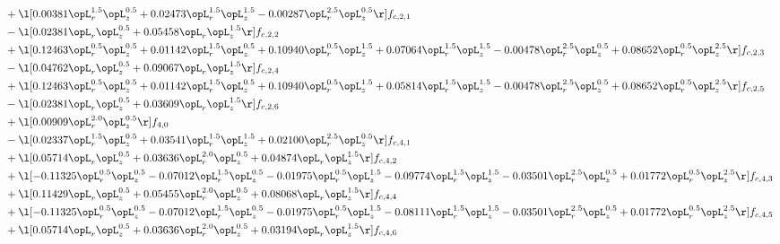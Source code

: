 \begin{alignat}{2}
& + \l[  0.00381 \opL_r^{1.5} \opL_z^{0.5} +  0.02473 \opL_r^{1.5} \opL_z^{1.5}   -0.00287 \opL_r^{2.5} \opL_z^{0.5}  \r] f_{c,2,1} \nonumber \\ 
& - \l[  0.02381 \opL_r \opL_z^{0.5} +  0.05458 \opL_r \opL_z^{1.5}  \r] f_{c,2,2} \nonumber \\ 
& + \l[  0.12463 \opL_r^{0.5} \opL_z^{0.5} +  0.01142 \opL_r^{1.5} \opL_z^{0.5} +  0.10940 \opL_r^{0.5} \opL_z^{1.5} +  0.07064 \opL_r^{1.5} \opL_z^{1.5}   -0.00478 \opL_r^{2.5} \opL_z^{0.5} +  0.08652 \opL_r^{0.5} \opL_z^{2.5}  \r] f_{c,2,3} \nonumber \\ 
& - \l[  0.04762 \opL_r \opL_z^{0.5} +  0.09067 \opL_r \opL_z^{1.5}  \r] f_{c,2,4} \nonumber \\ 
& + \l[  0.12463 \opL_r^{0.5} \opL_z^{0.5} +  0.01142 \opL_r^{1.5} \opL_z^{0.5} +  0.10940 \opL_r^{0.5} \opL_z^{1.5} +  0.05814 \opL_r^{1.5} \opL_z^{1.5}   -0.00478 \opL_r^{2.5} \opL_z^{0.5} +  0.08652 \opL_r^{0.5} \opL_z^{2.5}  \r] f_{c,2,5} \nonumber \\ 
& - \l[  0.02381 \opL_r \opL_z^{0.5} +  0.03609 \opL_r \opL_z^{1.5}  \r] f_{c,2,6} \nonumber \\ 
& + \l[  0.00909 \opL_r^{2.0} \opL_z^{0.5}  \r] f_{4,0} \nonumber \\ 
& - \l[  0.02337 \opL_r^{1.5} \opL_z^{0.5} +  0.03541 \opL_r^{1.5} \opL_z^{1.5} +  0.02100 \opL_r^{2.5} \opL_z^{0.5}  \r] f_{c,4,1} \nonumber \\ 
& + \l[  0.05714 \opL_r \opL_z^{0.5} +  0.03636 \opL_r^{2.0} \opL_z^{0.5} +  0.04874 \opL_r \opL_z^{1.5}  \r] f_{c,4,2} \nonumber \\ 
& + \l[  -0.11325 \opL_r^{0.5} \opL_z^{0.5}   -0.07012 \opL_r^{1.5} \opL_z^{0.5}   -0.01975 \opL_r^{0.5} \opL_z^{1.5}   -0.09774 \opL_r^{1.5} \opL_z^{1.5}   -0.03501 \opL_r^{2.5} \opL_z^{0.5} +  0.01772 \opL_r^{0.5} \opL_z^{2.5}  \r] f_{c,4,3} \nonumber \\ 
& + \l[  0.11429 \opL_r \opL_z^{0.5} +  0.05455 \opL_r^{2.0} \opL_z^{0.5} +  0.08068 \opL_r \opL_z^{1.5}  \r] f_{c,4,4} \nonumber \\ 
& + \l[  -0.11325 \opL_r^{0.5} \opL_z^{0.5}   -0.07012 \opL_r^{1.5} \opL_z^{0.5}   -0.01975 \opL_r^{0.5} \opL_z^{1.5}   -0.08111 \opL_r^{1.5} \opL_z^{1.5}   -0.03501 \opL_r^{2.5} \opL_z^{0.5} +  0.01772 \opL_r^{0.5} \opL_z^{2.5}  \r] f_{c,4,5} \nonumber \\ 
& + \l[  0.05714 \opL_r \opL_z^{0.5} +  0.03636 \opL_r^{2.0} \opL_z^{0.5} +  0.03194 \opL_r \opL_z^{1.5}  \r] f_{c,4,6} \nonumber \\ 

\end{alignat}

